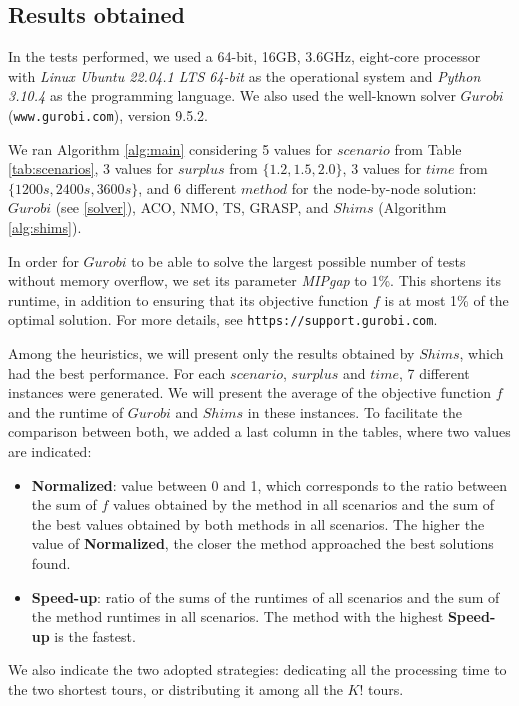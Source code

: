 \documentclass[preprint]{elsarticle}
\begin{document}
\subsection{Results obtained}

In the tests performed, we used a 64-bit, 16GB, 3.6GHz, eight-core processor with {\it Linux Ubuntu 22.04.1 LTS 64-bit} as the operational system and {\it Python 3.10.4}\/ as the programming language. We also used the well-known solver $Gurobi$\/ ({\tt www.gurobi.com}), version 9.5.2.

We ran Algorithm \ref{alg:main} considering 5 values for $scenario$\/ from Table \ref{tab:scenarios}, 3 values for  $surplus$\/ from $\{1.2, 1.5, 2.0\}$, 3 values for $time$\/ from $\{1200s, 2400s, 3600s\}$, and 6 different $method$\/ for the node-by-node solution: $Gurobi$\/ (see \ref{solver}), ACO, NMO, TS, GRASP, and $Shims$\/ (Algorithm \ref{alg:shims}). 

In order for $Gurobi$\/ to be able to solve the largest possible number of tests without memory overflow, we set its parameter {\it MIPgap}\/ to 1\%. This shortens its runtime, in addition to ensuring that its objective function $f$\/ is at most 1\% of the optimal solution. For more details, see {\tt https://support.gurobi.com}.

Among the heuristics, we will present only the results obtained by $Shims$, which had the best performance. For each $scenario$, $surplus$\/ and $time$, 7 different instances were generated. We will present the average of the objective function $f$\/ and the runtime of $Gurobi$\/ and $Shims$\/ in these instances. To facilitate the comparison between both, we added a last column in the tables, where two values are indicated:
\begin{itemize}
	\item {\bf Normalized}: value between 0 and 1, which corresponds to the ratio between the sum of $f$\/ values obtained by the method in all scenarios and the sum of the best values obtained by both methods in all scenarios. The higher the value of {\bf Normalized}, the closer the method approached the best solutions found.
	\item {\bf Speed-up}: ratio of the sums of the runtimes of all scenarios and the sum of the method runtimes in all scenarios. The method with the highest {\bf Speed-up}\/ is the fastest.
\end{itemize}

We also indicate the two adopted strategies: dedicating all the processing time to the two shortest tours, or distributing it among all the $K!$\/ tours.
\end{document}
